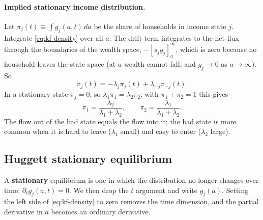 \paragraph{Implied stationary income distribution.}
Let $\pi_j(t)\equiv\int g_j(a,t)\,da$ be the share of households in income state $j$. Integrate \eqref{eq:kf-density} over all $a$. The drift term integrates to the net flux through the boundaries of the wealth space, $-[s_jg_j]_{\underline a}^{\infty}$, which is zero because no household leaves the state space (at $\underline a$ wealth cannot fall, and $g_j\to0$ as $a\to\infty$). So
\begin{equation*}
  \dot\pi_j(t) = -\lambda_j\pi_j(t)+\lambda_{-j}\pi_{-j}(t).
\end{equation*}
In a stationary state $\dot\pi_j=0$, so $\lambda_1\pi_1=\lambda_2\pi_2$; with $\pi_1+\pi_2=1$ this gives
\begin{equation}\label{eq:pi-stat}
  \pi_1=\frac{\lambda_2}{\lambda_1+\lambda_2},\qquad \pi_2=\frac{\lambda_1}{\lambda_1+\lambda_2}.
\end{equation}
The flow out of the bad state equals the flow into it; the bad state is more common when it is hard to leave ($\lambda_1$ small) and easy to enter ($\lambda_2$ large).

\subsection{Huggett stationary equilibrium }

A \textbf{stationary} equilibrium is one in which the distribution no longer changes over time: $\partial_t g_j(a,t)=0$. We then drop the $t$ argument and write $g_j(a)$. Setting the left side of \eqref{eq:kf-density} to zero removes the time dimension, and the partial derivative in $a$ becomes an ordinary derivative.


